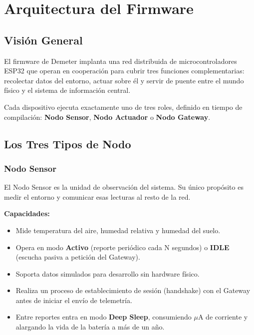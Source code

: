 \chapter{Arquitectura del Firmware}

\section{Visión General}

El firmware de Demeter implanta una red distribuida de microcontroladores ESP32 que operan
en cooperación para cubrir tres funciones complementarias: recolectar datos del entorno,
actuar sobre él y servir de puente entre el mundo físico y el sistema de información central.

Cada dispositivo ejecuta exactamente uno de tres roles, definido en tiempo de compilación:
\textbf{Nodo Sensor}, \textbf{Nodo Actuador} o \textbf{Nodo Gateway}.

\section{Los Tres Tipos de Nodo}

\subsection{Nodo Sensor}

El Nodo Sensor es la unidad de observación del sistema. Su único propósito es medir el entorno
y comunicar esas lecturas al resto de la red.

\textbf{Capacidades:}
\begin{itemize}[leftmargin=*, label=--]
    \item Mide temperatura del aire, humedad relativa y humedad del suelo.
    \item Opera en modo \textbf{Activo} (reporte periódico cada N segundos) o
          \textbf{IDLE} (escucha pasiva a petición del Gateway).
    \item Soporta datos simulados para desarrollo sin hardware físico.
    \item Realiza un proceso de establecimiento de sesión (handshake) con el Gateway antes
          de iniciar el envío de telemetría.
    \item Entre reportes entra en modo \textbf{Deep Sleep}, consumiendo $\mu$A de corriente
          y alargando la vida de la batería a más de un año.
\end{itemize}

